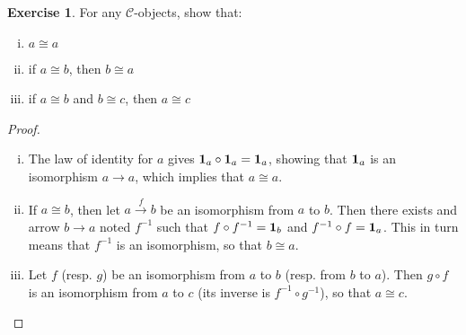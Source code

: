 \documentclass[11pt,a4paper,twoside]{article}
\newcommand{\aname}[1]{{\normalfont\textbf{#1}}}
\newcommand{\Id}{\aname{1}}
\theoremstyle{definition}
\newcounter{excounter}
\newtheorem{exercise}[excounter]{Exercise}
\begin{document}
\begin{exercise}

  For any $\mathscr{C}$-objects, show that:
  \begin{enumerate}[i)]
  \item $a \cong a$
  \item if $a \cong b$, then $b \cong a$
  \item if $a \cong b$ and $b \cong c$, then $a \cong c$
  \end{enumerate}

\end{exercise}

\begin{proof}\hfill

  \begin{enumerate}[i)]
  \item The law of identity for $a$ gives $\Id_a \circ \Id_a = \Id_a$, showing that $\Id_a$ is an isomorphism $a \to a$, which implies that $a \cong a$.
  \item If $a \cong b$, then let $a \xrightarrow{f} b$ be an isomorphism from $a$ to $b$. Then there exists and arrow $b \to a$ noted $f^{-1}$ such that $f \circ f^{-1} = \Id_b$ and $f^{-1} \circ f = \Id_a$. This in turn means that $f^{-1}$ is an isomorphism, so that $b \cong a$.
  \item Let $f$ (resp. $g$) be an isomorphism from $a$ to $b$ (resp. from $b$ to $a$). Then $g \circ f$ is an isomorphism from $a$ to $c$ (its inverse is $f^{-1} \circ g^{-1}$), so that $a \cong c$.
  \end{enumerate}

\end{proof}
\end{document}
